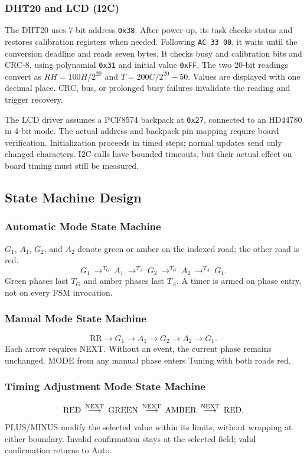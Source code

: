 \subsubsection{DHT20 and LCD (I2C)}
The DHT20 uses 7-bit address \texttt{0x38}. After power-up, its task checks status and restores calibration registers when needed. Following \texttt{AC 33 00}, it waits until the conversion deadline and reads seven bytes. It checks busy and calibration bits and CRC-8, using polynomial \texttt{0x31} and initial value \texttt{0xFF}. The two 20-bit readings convert as $RH=100H/2^{20}$ and $T=200C/2^{20}-50$. Values are displayed with one decimal place. CRC, bus, or prolonged busy failures invalidate the reading and trigger recovery.

The LCD driver assumes a PCF8574 backpack at \texttt{0x27}, connected to an HD44780 in 4-bit mode. The actual address and backpack pin mapping require board verification. Initialization proceeds in timed steps; normal updates send only changed characters. I2C calls have bounded timeouts, but their actual effect on board timing must still be measured.

\subsection{State Machine Design}
\subsubsection{Automatic Mode State Machine}
$G_1$, $A_1$, $G_2$, and $A_2$ denote green or amber on the indexed road; the other road is red.
\[
G_1\ \mathop{\longrightarrow}^{T_G}\ A_1\
\mathop{\longrightarrow}^{T_A}\ G_2\
\mathop{\longrightarrow}^{T_G}\ A_2\
\mathop{\longrightarrow}^{T_A}\ G_1.
\]
Green phases last $T_G$ and amber phases last $T_A$. A timer is armed on phase entry, not on every FSM invocation.

\subsubsection{Manual Mode State Machine}
\[
\mathrm{RR}\longrightarrow G_1\longrightarrow A_1\longrightarrow G_2
\longrightarrow A_2\longrightarrow G_1.
\]
Each arrow requires NEXT. Without an event, the current phase remains unchanged. MODE from any manual phase enters Tuning with both roads red.

\subsubsection{Timing Adjustment Mode State Machine}
\[
\mathrm{RED}\ \mathop{\longrightarrow}^{\rm NEXT}\ \mathrm{GREEN}\
\mathop{\longrightarrow}^{\rm NEXT}\ \mathrm{AMBER}\
\mathop{\longrightarrow}^{\rm NEXT}\ \mathrm{RED}.
\]
PLUS/MINUS modify the selected value within its limits, without wrapping at either boundary. Invalid confirmation stays at the selected field; valid confirmation returns to Auto.

